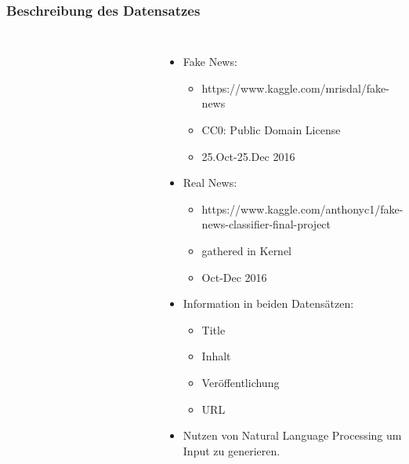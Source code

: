 \documentclass[aspectratio=1610, professionalfonts, 9pt]{beamer}
\begin{document}
  \begin{frame}
    \frametitle{Beschreibung des Datensatzes}
    \begin{columns}
      \begin{figure}
          \includegraphics[width=\textwidth]{pictures/fake.PNG}
          \caption{}
          \label{}
      \end{figure}
      \begin{figure}
          \includegraphics[width=\textwidth]{pictures/real.PNG}
          \caption{\cite{data}}
          \label{}
      \end{figure}
      \begin{itemize}
      \item Fake News:
      \begin{itemize}
        \item https://www.kaggle.com/mrisdal/fake-news
        \item CC0: Public Domain License
        \item 25.Oct-25.Dec 2016
      \end{itemize}     
      \item Real News: 
      \begin{itemize}
        \item https://www.kaggle.com/anthonyc1/fake-news-classifier-final-project
        \item gathered in Kernel 
        \item Oct-Dec 2016
      \end{itemize}
      \item Information in beiden Datensätzen:
      \begin{itemize}
      \item Title
      \item Inhalt
      \item Veröffentlichung
      \item URL
      \end{itemize}
      \item Nutzen von Natural Language Processing um Input zu generieren.
      \end{itemize}
    \end{columns}
  \end{frame}
\end{document}
